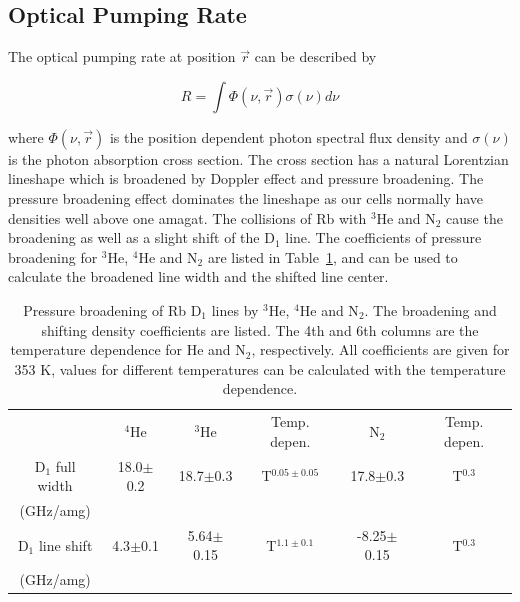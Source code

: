 \subsection{Optical Pumping Rate}

The optical pumping rate at position $\vec{r}$ can be described by

\begin{equation}
R = \int \Phi(\nu, \vec{r})\sigma(\nu)d\nu
\end{equation}

where $\Phi(\nu,\vec{r})$ is the position dependent photon spectral flux density and $\sigma(\nu)$ is the photon absorption cross section. The cross section has a natural Lorentzian lineshape which is broadened by Doppler effect and pressure broadening. The pressure broadening effect dominates the lineshape as our cells normally have densities well above one amagat. The collisions of Rb with $^{3}$He and N$_{2}$ cause the broadening as well as a slight shift of the D$_{1}$ line. The coefficients of pressure broadening for $^{3}$He, $^{4}$He and N$_{2}$ are listed in Table~\ref{PBCoef}, and can be used to calculate the broadened line width and the shifted line center.

\begin{table}[t!]
	\begin{center}
		\caption{ Pressure broadening of Rb D$_{1}$ lines by $^{3}$He, $^{4}$He and N$_{2}$. The broadening and shifting density coefficients are listed. The 4th and 6th columns are the temperature dependence for He and N$_{2}$, respectively. All coefficients are given for 353 K, values for different temperatures can be calculated with the temperature dependence.}
		\label{PBCoef}
		\begin{tabular}{ c c c c c c}
			\hline \hline
			& $^{4}$He & $^{3}$He & Temp. depen. & N$_{2}$ & Temp. depen.\\ 
			D$_{1}$ full width & 18.0$\pm$0.2 & 18.7$\pm$0.3 & T$^{0.05\pm0.05}$ & 17.8$\pm$0.3 & T$^{0.3}$\\ 
			(GHz/amg) &&&&& \\
			D$_{1}$ line shift & 4.3$\pm$0.1 & 5.64$\pm$0.15 & T$^{1.1\pm0.1}$ &
			-8.25$\pm$0.15 & T$^{0.3}$ \\ 
			(GHz/amg) &&&&& \\ \hline \hline
		\end{tabular}
	\end{center}
\end{table}

